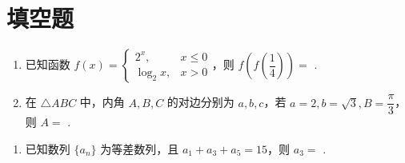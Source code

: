 \documentclass[11pt,a4paper]{article}
\begin{document}
\section*{填空题}

\begin{enumerate}[label=\arabic*., leftmargin=1.5em]

\item 已知函数 \( f(x) = \begin{cases} 2^x, & x \leq 0 \\ \log_2 x, & x > 0 \end{cases} \)，则 \( f\left( f\left( \dfrac{1}{4} \right) \right) = \) \underline{\hspace{3cm}}.

\item 在 \(\triangle ABC\) 中，内角 \(A, B, C\) 的对边分别为 \(a, b, c\)，若 \(a = 2, b = \sqrt{3}, B = \dfrac{\pi}{3}\)，则 \(A = \) \underline{\hspace{3cm}}.

\end{enumerate}

\begin{enumerate}[label=\arabic*., start=3, leftmargin=1.5em]

\item 已知数列 \(\{a_n\}\) 为等差数列，且 \(a_1 + a_3 + a_5 = 15\)，则 \(a_3 = \) \underline{\hspace{3cm}}.

\end{enumerate}
\end{document}
